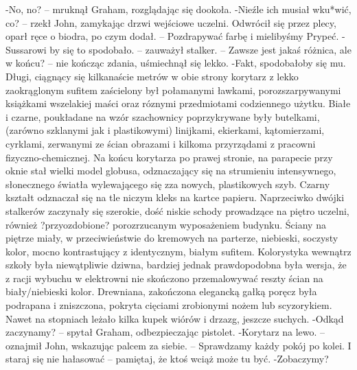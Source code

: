 \documentclass[../MAIN.tex]{subfiles}
\begin{document}
-No, no? -- mruknął Graham, rozglądając się dookoła.
-Nieźle ich musiał wku*wić, co? -- rzekł John, zamykając drzwi wejściowe uczelni. Odwrócił się przez plecy, oparł ręce o biodra, po czym dodał. -- Pozdrapywać farbę i mielibyśmy Prypeć.
-Sussarowi by się to spodobało. -- zauważył stalker. -- Zawsze jest jakaś różnica, ale w końcu? -- nie kończąc zdania, uśmiechnął się lekko.
-Fakt, spodobałoby się mu.
Długi, ciągnący się kilkanaście metrów w obie strony korytarz z lekko zaokrąglonym sufitem zaścielony był połamanymi ławkami, porozszarpywanymi książkami wszelakiej maści oraz róznymi przedmiotami codziennego użytku. Białe i czarne, poukładane na wzór szachownicy poprzykrywane były butelkami, (zarówno szklanymi jak i plastikowymi) linijkami, ekierkami, kątomierzami, cyrklami, zerwanymi ze ścian obrazami i kilkoma przyrządami z pracowni fizyczno-chemicznej.
Na końcu korytarza po prawej stronie, na parapecie przy oknie stał wielki model globusa, odznaczający się na strumieniu intensywnego, słonecznego światła wylewającego się zza nowych, plastikowych szyb. Czarny kształt odznaczał się na tle niczym kleks na kartce papieru.
Naprzeciwko dwójki stalkerów zaczynały się szerokie, dość niskie schody prowadzące na piętro uczelni, również ?przyozdobione? porozrzucanym wyposażeniem budynku. Ściany na piętrze miały, w przeciwieństwie do kremowych na parterze, niebieski, soczysty kolor, mocno kontrastujący z identycznym, białym sufitem. Kolorystyka wewnątrz szkoły była niewątpliwie dziwna, bardziej jednak prawdopodobna była wersja, że z racji wybuchu w elektrowni nie skończono przemalowywać reszty ścian na biały/niebieski kolor.
Drewniana, zakończona elegancką gałką poręcz była podrapana i zniszczona, pokryta cięciami zrobionymi nożem lub scyzorykiem. Nawet na stopniach leżało kilka kupek wiórów i drzazg, jeszcze suchych.
-Odkąd zaczynamy? -- spytał Graham, odbezpieczając pistolet.
-Korytarz na lewo. -- oznajmił John, wskazując palcem za siebie. -- Sprawdzamy każdy pokój po kolei. I staraj się nie hałasować -- pamiętaj, że ktoś wciąż może tu być.
-Zobaczymy?
\end{document}
